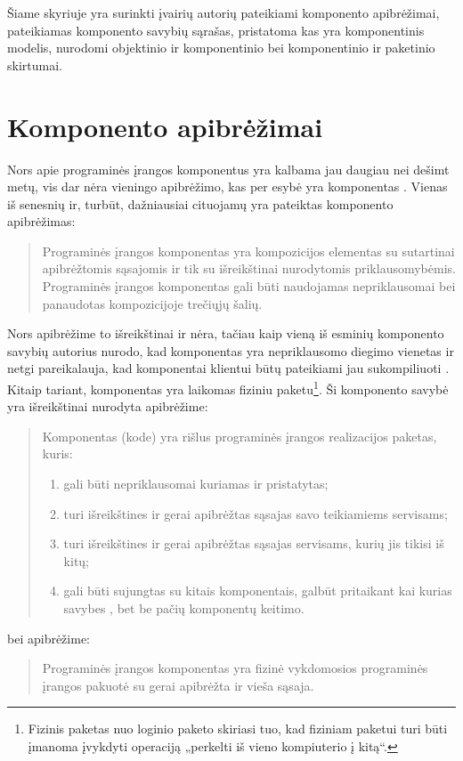
\label{chapter:component}

Šiame skyriuje yra surinkti įvairių autorių pateikiami komponento
apibrėžimai, pateikiamas komponento savybių sąrašas, pristatoma kas
yra komponentinis modelis, nurodomi objektinio ir komponentinio
bei komponentinio ir paketinio skirtumai.

\section{Komponento apibrėžimai}

Nors apie programinės įrangos komponentus yra kalbama jau daugiau
nei dešimt metų, vis dar nėra vieningo apibrėžimo, kas per esybė
yra komponentas \cite{classification-framework-for-scm}. Vienas
iš senesnių ir, turbūt, dažniausiai cituojamų yra 
\cite[41]{cs-beyond-object-oriented-programming}
pateiktas komponento apibrėžimas:
\begin{quote}
  Programinės įrangos komponentas yra kompozicijos elementas su
  sutartinai apibrėžtomis sąsajomis ir tik su išreikštinai
  nurodytomis priklausomybėmis. Programinės įrangos komponentas
  gali būti naudojamas nepriklausomai bei panaudotas
  kompozicijoje trečiųjų šalių.
\end{quote}
Nors apibrėžime to išreikštinai ir nėra, tačiau kaip vieną iš
esminių komponento savybių autorius nurodo, kad komponentas yra
nepriklausomo diegimo vienetas 
\cite[36]{cs-beyond-object-oriented-programming} ir netgi
pareikalauja, kad komponentai klientui būtų pateikiami jau
sukompiliuoti \cite{point-counterpoint}. Kitaip tariant, komponentas
yra laikomas fiziniu paketu\footnote{Fizinis paketas nuo loginio paketo
skiriasi tuo, kad fiziniam paketui turi būti įmanoma įvykdyti
operaciją „perkelti iš vieno kompiuterio į kitą“.}. Ši
komponento savybė yra išreikštinai
nurodyta \cite[385]{objects-components-and-frameworks-with-uml}
apibrėžime:
\begin{quote}
  Komponentas (kode) yra rišlus programinės įrangos realizacijos
  paketas, kuris:
  \begin{enumerate}
    \item gali būti nepriklausomai kuriamas ir pristatytas;
    \item turi išreikštines ir gerai apibrėžtas sąsajas savo teikiamiems
      servisams;
    \item turi išreikštines ir gerai apibrėžtas sąsajas servisams,
      kurių jis tikisi iš kitų;
    \item gali būti sujungtas su kitais komponentais, galbūt pritaikant
      kai kurias savybes , bet be pačių komponentų
      keitimo.
  \end{enumerate}
\end{quote}
bei \cite[1]{Hopkins:2000:CP:352183.352198} apibrėžime:
\begin{quote}
  Programinės įrangos komponentas yra fizinė vykdomosios programinės
  įrangos pakuotė su gerai apibrėžta ir vieša sąsaja.
\end{quote}


